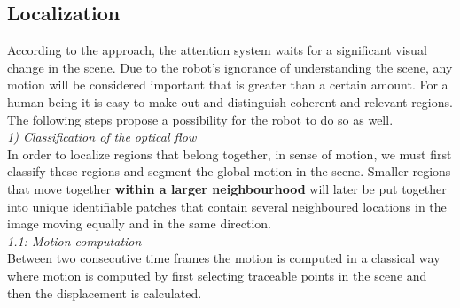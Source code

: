 \subsection{Localization}\label{method:localization}
According to the approach, the attention system waits for a significant visual change in the scene. Due to the robot's ignorance of understanding the scene, any motion will be considered important that is greater than a certain amount. For a human being it is easy to make out and distinguish coherent and relevant regions. The following steps propose a possibility for the robot to do so as well.\\ \newline
%
%
\textit{1) Classification of the optical flow}\\ \newline
In order to localize regions that belong together, in sense of motion, we must first classify these regions and segment the global motion in the scene. Smaller regions that move together \textbf{within a larger neighbourhood } will later be put together into unique identifiable patches that contain several neighboured locations in the image moving equally and in the same direction.\\ \newline
%
\textit{1.1: Motion computation}\\ \newline
Between two consecutive time frames the motion is computed in a classical way where motion is computed by first selecting traceable points in the scene and then the displacement is calculated.
